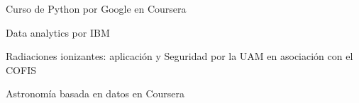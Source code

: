Curso de Python por Google en Coursera

Data analytics por IBM

Radiaciones ionizantes: aplicación y Seguridad por la UAM en asociación con el COFIS

Astronomía basada en datos en Coursera




